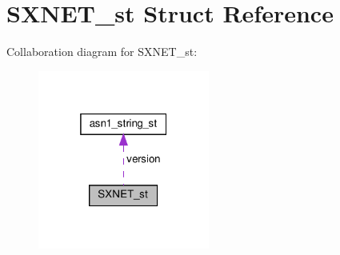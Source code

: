 \hypertarget{structSXNET__st}{}\section{S\+X\+N\+E\+T\+\_\+st Struct Reference}
\label{structSXNET__st}


Collaboration diagram for S\+X\+N\+E\+T\+\_\+st\+:
\nopagebreak
\begin{figure}[H]
\begin{center}
\leavevmode
\includegraphics[width=160pt]{structSXNET__st__coll__graph}
\end{center}
\end{figure}
